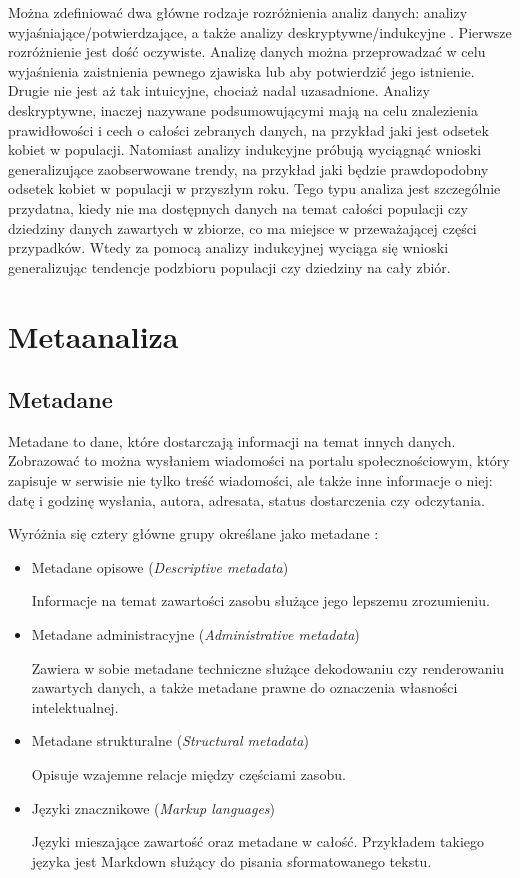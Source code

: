 	Można zdefiniować dwa główne rodzaje rozróżnienia analiz danych: analizy wyjaśniające/potwierdzające, a także analizy deskryptywne/indukcyjne \cite{berthold2003intelligent}.
	Pierwsze rozróżnienie jest dość oczywiste.
	Analizę danych można przeprowadzać w celu wyjaśnienia zaistnienia pewnego zjawiska lub aby potwierdzić jego istnienie.
	Drugie nie jest aż tak intuicyjne, chociaż nadal uzasadnione.
	Analizy deskryptywne, inaczej nazywane podsumowującymi mają na celu znalezienia prawidłowości i cech o całości zebranych danych, na przykład jaki jest odsetek kobiet w populacji.
	Natomiast analizy indukcyjne próbują wyciągnąć wnioski generalizujące zaobserwowane trendy, na przykład jaki będzie prawdopodobny odsetek kobiet w populacji w przyszłym roku.
	Tego typu analiza jest szczególnie przydatna, kiedy nie ma dostępnych danych na temat całości populacji czy dziedziny danych zawartych w zbiorze, co ma miejsce w przeważającej części przypadków.
	Wtedy za pomocą analizy indukcyjnej wyciąga się wnioski generalizując tendencje podzbioru populacji czy dziedziny na cały zbiór.

\section{Metaanaliza}
	\subsection{Metadane}

	Metadane to dane, które dostarczają informacji na temat innych danych.
	Zobrazować to można wysłaniem wiadomości na portalu społecznościowym, który zapisuje w serwisie nie tylko treść wiadomości, ale także inne informacje o niej: datę i godzinę wysłania, autora, adresata, status dostarczenia czy odczytania.

	Wyróżnia się cztery główne grupy określane jako metadane \cite{riley2017understanding}:

	\begin{itemize}
		\item Metadane opisowe (\emph{Descriptive metadata})

		Informacje na temat zawartości zasobu służące jego lepszemu zrozumieniu.

		\item Metadane administracyjne (\emph{Administrative metadata})

		Zawiera w sobie metadane techniczne służące dekodowaniu czy renderowaniu zawartych danych, a także metadane prawne do oznaczenia własności intelektualnej.

		\item Metadane strukturalne (\emph{Structural metadata})

		Opisuje wzajemne relacje między częściami zasobu.

		\item Języki znacznikowe (\emph{Markup languages})

		Języki mieszające zawartość oraz metadane w całość.
		Przykładem takiego języka jest Markdown służący do pisania sformatowanego tekstu.

	\end{itemize}

